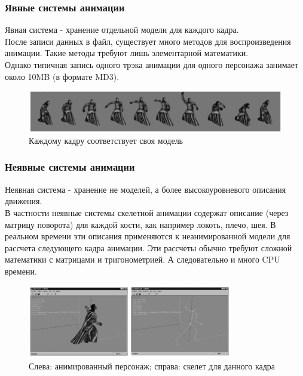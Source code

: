\documentclass{beamer}
\begin{document}
\begin{frame}
\frametitle{Явные системы анимации}
\begin{scriptsize}
    Явная система - хранение отдельной модели для каждого кадра. \\
    После записи данных в файл, существует много методов для воспроизведения анимации.
    Такие методы требуют лишь элементарной математики. \\
    Однако типичная запись одного трэка анимации для одного персонажа занимает около 10MB (в формате MD3).
   
\begin{figure}[h!]
    \centering
    \includegraphics[width=1\textwidth]{explicit_animation.png}
    \caption{Каждому кадру соответствует своя модель}
\end{figure}

\end{scriptsize}
\end{frame}

  
\begin{frame}
\frametitle{Неявные системы анимации}
\begin{scriptsize}
    Неявная система - хранение не моделей, а более высокоуровневого описания движения. \\
    В частности неявные \alert{системы скелетной анимации} содержат описание (через матрицу поворота) для каждой кости, как например локоть, плечо, шея. В реальном времени эти описания применяются к неанимированной модели для рассчета следующего кадра анимации. Эти рассчеты обычно требуют сложной математики с матрицами и тригонометрией. А следовательно и много CPU времени.
    
\begin{figure}[h!]
    \centering
    \includegraphics[width=0.8\textwidth]{implicit_animation.png}
    \caption{\scriptsize{Слева: анимированный персонаж; справа: скелет для данного кадра}}
\end{figure}

\end{scriptsize}
\end{frame}
\end{document}
